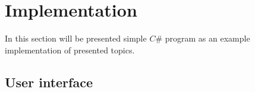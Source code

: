 \section{Implementation}

In this section will be presented simple $C\#$ program as an example implementation of presented topics.

\subsection{User interface}
